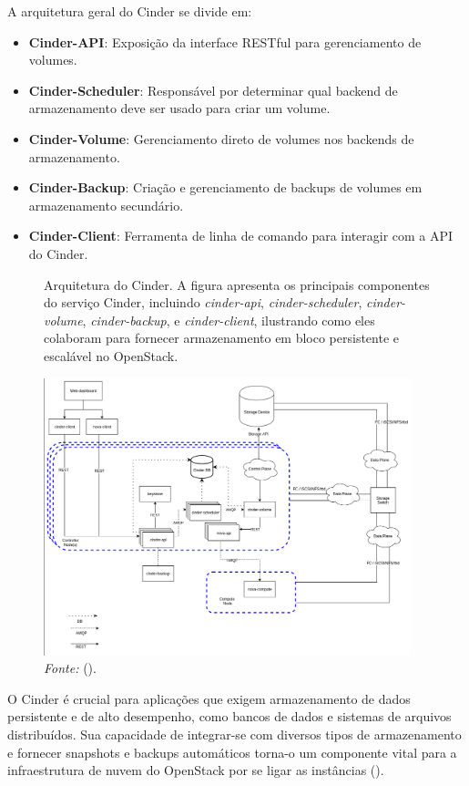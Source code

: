 A arquitetura geral do Cinder se divide em:

\begin{itemize}
    \item \textbf{Cinder-API}: Exposição da interface RESTful para gerenciamento de volumes.
    \item \textbf{Cinder-Scheduler}: Responsável por determinar qual backend de armazenamento deve ser usado para criar um volume.
    \item \textbf{Cinder-Volume}: Gerenciamento direto de volumes nos backends de armazenamento.
    \item \textbf{Cinder-Backup}: Criação e gerenciamento de backups de volumes em armazenamento    secundário.
    \item \textbf{Cinder-Client}: Ferramenta de linha de comando para interagir com a API do Cinder.
\end{itemize}


\begin{figure}[htbp]
  \centering
  \caption{Arquitetura do Cinder. A figura apresenta os principais componentes do serviço Cinder, incluindo \textit{cinder-api}, \textit{cinder-scheduler}, \textit{cinder-volume}, \textit{cinder-backup}, e \textit{cinder-client}, ilustrando como eles colaboram para fornecer armazenamento em bloco persistente e escalável no OpenStack.}
  \includegraphics[width=0.95\textwidth]{images/cinder_architecture.png}
  \caption*{\textit{Fonte:} (\cite{OpenStackCinder}).}
  \label{fig:cinder_architecture}
\end{figure}


O Cinder é crucial para aplicações que exigem armazenamento de dados persistente e de alto desempenho, como bancos de dados e sistemas de arquivos distribuídos. Sua capacidade de integrar-se com diversos tipos de armazenamento e fornecer snapshots e backups automáticos torna-o um componente vital para a infraestrutura de nuvem do OpenStack por se ligar as instâncias (\cite{OpenStackCinder}).



